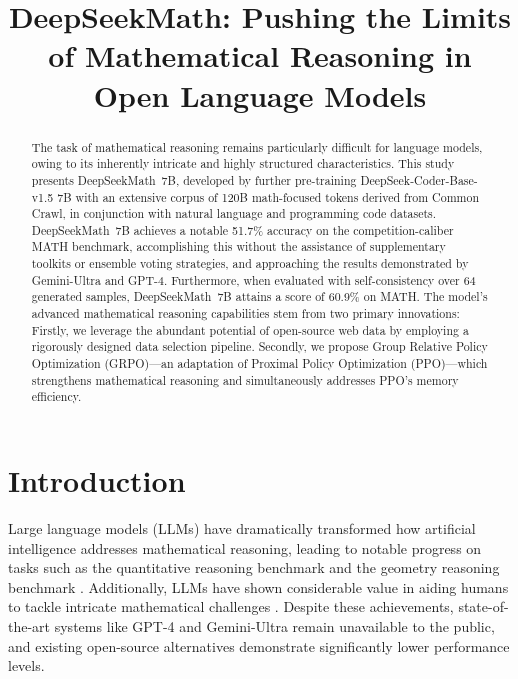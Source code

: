 \title{DeepSeekMath: Pushing the Limits of Mathematical Reasoning in Open Language Models}

\begin{abstract}
The task of mathematical reasoning remains particularly difficult for language models, owing to its inherently intricate and highly structured characteristics. This study presents DeepSeekMath~7B, developed by further pre-training DeepSeek-Coder-Base-v1.5 7B with an extensive corpus of 120B math-focused tokens derived from Common Crawl, in conjunction with natural language and programming code datasets. DeepSeekMath~7B achieves a notable 51.7\% accuracy on the competition-caliber MATH benchmark, accomplishing this without the assistance of supplementary toolkits or ensemble voting strategies, and approaching the results demonstrated by Gemini-Ultra and GPT-4. Furthermore, when evaluated with self-consistency over 64 generated samples, DeepSeekMath~7B attains a score of 60.9\% on MATH. The model’s advanced mathematical reasoning capabilities stem from two primary innovations: Firstly, we leverage the abundant potential of open-source web data by employing a rigorously designed data selection pipeline. Secondly, we propose Group Relative Policy Optimization (GRPO)—an adaptation of Proximal Policy Optimization (PPO)—which strengthens mathematical reasoning and simultaneously addresses PPO's memory efficiency.
\end{abstract}

\section{Introduction}

Large language models (LLMs) have dramatically transformed how artificial intelligence addresses mathematical reasoning, leading to notable progress on tasks such as the quantitative reasoning benchmark \citep{MATH} and the geometry reasoning benchmark \citep{trinh2024solving}. Additionally, LLMs have shown considerable value in aiding humans to tackle intricate mathematical challenges \citep{tao}. Despite these achievements, state-of-the-art systems like GPT-4 \citep{gpt4} and Gemini-Ultra \citep{gemini} remain unavailable to the public, and existing open-source alternatives demonstrate significantly lower performance levels.

